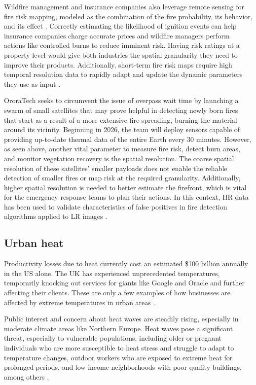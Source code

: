     Wildfire management and insurance companies also leverage remote sensing for fire risk mapping, modeled as the combination of the fire probability, its behavior, and its effect \cite{crichton99}. Correctly estimating the likelihood of ignition events can help insurance companies charge accurate prices and wildfire managers perform actions like controlled burns to reduce imminent risk. 
    Having risk ratings at a property level would give both industries the spatial granularity they need to improve their products. Additionally, short-term fire risk maps require high temporal resolution data to rapidly adapt and update the dynamic parameters they use as input \cite{rs11222638}.


    OroraTech seeks to circumvent the issue of overpass wait time by launching a swarm of small satellites that may prove helpful in detecting newly born fires that start as a result of a more extensive fire spreading, burning the material around its vicinity. Beginning in 2026,  the team will deploy sensors capable of providing up-to-date thermal data of the entire Earth every 30 minutes. However, as seen above, another vital parameter to measure fire risk, detect burn areas, and monitor vegetation recovery is the spatial resolution. The coarse spatial resolution of these satellites' smaller payloads does not enable the reliable detection of smaller fires or map risk at the required granularity. Additionally, higher spatial resolution is needed to better estimate the firefront, which is vital for the emergency response teams to plan their actions. In this context, HR data has been used to validate characteristics of false positives in fire detection algorithms applied to LR images \cite{ijgi11120601}. 

    \subsection{Urban heat}

    Productivity losses due to heat currently cost an estimated \$100 billion annually in the US alone.
    The UK has experienced unprecedented temperatures, temporarily knocking out services for giants like Google and Oracle and further affecting their clients.
    These are only a few examples of how businesses are affected by extreme temperatures in urban areas \cite{atlanticcouncil2021extreme}.  

    Public interest and concern about heat waves are steadily rising, especially in moderate climate areas like Northern Europe. Heat waves pose a significant threat, especially to vulnerable populations, including older or pregnant individuals who are more susceptible to heat stress and struggle to adapt to temperature changes, outdoor workers who are exposed to extreme heat for prolonged periods, and low-income neighborhoods with poor-quality buildings, among others \cite{Hsu2021Disproportionate}.   

